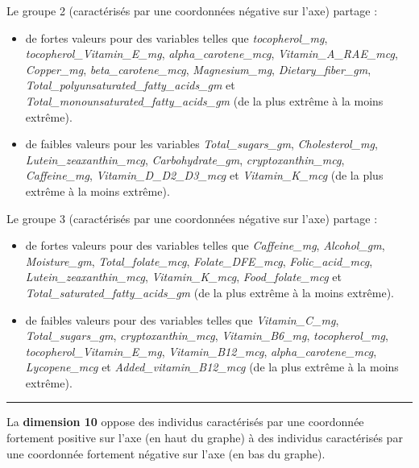 \documentclass[]{article}
\providecommand{\tightlist}{%
  \setlength{\itemsep}{0pt}\setlength{\parskip}{0pt}}
\begin{document}
Le groupe 2 (caractérisés par une coordonnées négative sur l'axe)
partage :

\begin{itemize}
\tightlist
\item
  de fortes valeurs pour des variables telles que \emph{tocopherol\_mg},
  \emph{tocopherol\_Vitamin\_E\_mg}, \emph{alpha\_carotene\_mcg},
  \emph{Vitamin\_A\_RAE\_mcg}, \emph{Copper\_mg},
  \emph{beta\_carotene\_mcg}, \emph{Magnesium\_mg},
  \emph{Dietary\_fiber\_gm},
  \emph{Total\_polyunsaturated\_fatty\_acids\_gm} et
  \emph{Total\_monounsaturated\_fatty\_acids\_gm} (de la plus extrême à
  la moins extrême).
\item
  de faibles valeurs pour les variables \emph{Total\_sugars\_gm},
  \emph{Cholesterol\_mg}, \emph{Lutein\_zeaxanthin\_mcg},
  \emph{Carbohydrate\_gm}, \emph{cryptoxanthin\_mcg},
  \emph{Caffeine\_mg}, \emph{Vitamin\_D\_D2\_D3\_mcg} et
  \emph{Vitamin\_K\_mcg} (de la plus extrême à la moins extrême).
\end{itemize}

Le groupe 3 (caractérisés par une coordonnées négative sur l'axe)
partage :

\begin{itemize}
\tightlist
\item
  de fortes valeurs pour des variables telles que \emph{Caffeine\_mg},
  \emph{Alcohol\_gm}, \emph{Moisture\_gm}, \emph{Total\_folate\_mcg},
  \emph{Folate\_DFE\_mcg}, \emph{Folic\_acid\_mcg},
  \emph{Lutein\_zeaxanthin\_mcg}, \emph{Vitamin\_K\_mcg},
  \emph{Food\_folate\_mcg} et \emph{Total\_saturated\_fatty\_acids\_gm}
  (de la plus extrême à la moins extrême).
\item
  de faibles valeurs pour des variables telles que
  \emph{Vitamin\_C\_mg}, \emph{Total\_sugars\_gm},
  \emph{cryptoxanthin\_mcg}, \emph{Vitamin\_B6\_mg},
  \emph{tocopherol\_mg}, \emph{tocopherol\_Vitamin\_E\_mg},
  \emph{Vitamin\_B12\_mcg}, \emph{alpha\_carotene\_mcg},
  \emph{Lycopene\_mcg} et \emph{Added\_vitamin\_B12\_mcg} (de la plus
  extrême à la moins extrême).
\end{itemize}

\begin{center}\rule{0.5\linewidth}{\linethickness}\end{center}

La \textbf{dimension 10} oppose des individus caractérisés par une
coordonnée fortement positive sur l'axe (en haut du graphe) à des
individus caractérisés par une coordonnée fortement négative sur l'axe
(en bas du graphe).
\end{document}
